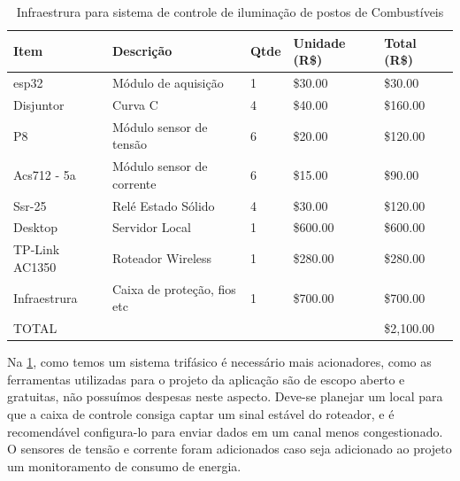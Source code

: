 \begin{table}[h]
\caption{Infraestrura para sistema de controle de iluminação de  postos de Combustíveis}
\begin{tabular}{|l|l|l|l|l|}
\hline
Item           & Descrição                   & Qtde & Unidade (R\$) & Total (R\$) \\ \hline
esp32          & Módulo de aquisição         & 1    & \$30.00       & \$30.00     \\ \hline
Disjuntor      & Curva C                     & 4    & \$40.00       & \$160.00    \\ \hline
P8             & Módulo sensor de tensão     & 6    & \$20.00       & \$120.00    \\ \hline
Acs712 - 5a    & Módulo sensor de corrente   & 6    & \$15.00       & \$90.00     \\ \hline
Ssr-25         & Relé Estado Sólido          & 4    & \$30.00       & \$120.00    \\ \hline
Desktop        & Servidor Local              & 1    & \$600.00      & \$600.00    \\ \hline
TP-Link AC1350 & Roteador Wireless           & 1    & \$280.00      & \$280.00    \\ \hline
Infraestrura   & Caixa de proteção, fios etc & 1    & \$700.00      & \$700.00    \\ \hline
\multicolumn{4}{|l|}{TOTAL}                                         & \$2,100.00  \\ \hline
\end{tabular}
\label{table:posto}
\end{table}		

Na \ref{table:posto}, como temos um sistema trifásico é necessário mais acionadores, como  as ferramentas utilizadas para o projeto da aplicação são de escopo aberto e gratuitas, não possuímos despesas neste aspecto. Deve-se planejar um local para que a caixa de controle consiga captar um sinal estável do roteador, e é recomendável configura-lo para enviar dados em um canal menos congestionado. O sensores de tensão e corrente foram adicionados caso seja adicionado ao projeto um monitoramento de consumo de energia.
